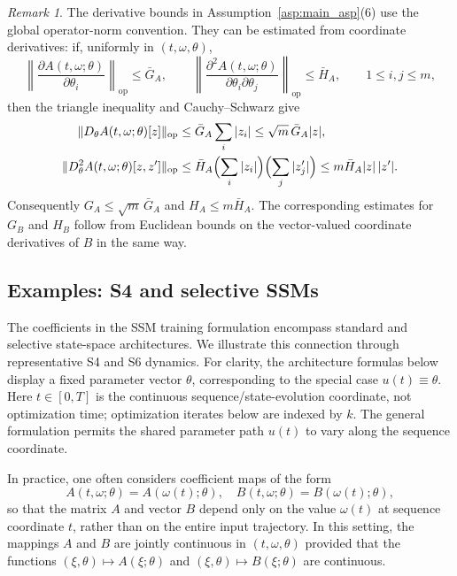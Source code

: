 \documentclass[11pt]{amsart}
\numberwithin{equation}{section} %
\theoremstyle{remark}
\newtheorem{remark}{Remark}[section]
\begin{document}
\begin{remark}\label{rmk:op_norm_AB}
The derivative bounds in Assumption~\ref{asp:main_asp}(6) use the global operator-norm convention. They can be estimated from coordinate derivatives: if, uniformly in $(t,\omega,\theta)$,
\[
    \left\|\frac{\partial A(t,\omega;\theta)}{\partial\theta_i}\right\|_{\mathrm{op}}
    \le\bar G_A,\qquad
    \left\|\frac{\partial^2A(t,\omega;\theta)}{\partial\theta_i\partial\theta_j}\right\|_{\mathrm{op}}
    \le\bar H_A,\qquad 1\le i,j\le m,
\]
then the triangle inequality and Cauchy--Schwarz give
\begin{align*}
    \|D_\theta A(t,\omega;\theta)[z]\|_{\mathrm{op}}
    &\le\bar G_A\sum_i|z_i|
    \le\sqrt m\,\bar G_A|z|,\\
    \|D_\theta^2A(t,\omega;\theta)[z,z']\|_{\mathrm{op}}
    &\le\bar H_A\Bigl(\sum_i|z_i|\Bigr)\Bigl(\sum_j|z'_j|\Bigr)
    \le m\bar H_A|z|\,|z'|.
\end{align*}
Consequently $G_A\le\sqrt m\,\bar G_A$ and $H_A\le m\bar H_A$. The corresponding estimates for $G_B$ and $H_B$ follow from Euclidean bounds on the vector-valued coordinate derivatives of $B$ in the same way.
\end{remark}

\subsection{Examples: S4 and selective SSMs}\label{subsec:ssm_examples}

The coefficients in the SSM training formulation encompass standard and selective state-space architectures. We illustrate this connection through representative S4 and S6 dynamics. For clarity, the architecture formulas below display a fixed parameter vector $\theta$, corresponding to the special case $u(t)\equiv\theta$. Here $t\in[0,T]$ is the continuous sequence/state-evolution coordinate, not optimization time; optimization iterates below are indexed by $k$. The general formulation permits the shared parameter path $u(t)$ to vary along the sequence coordinate.

In practice, one often considers coefficient maps of the form
\[
    A(t, \omega; \theta) = A(\omega(t); \theta), \quad B(t, \omega; \theta) = B(\omega(t); \theta),
\]
so that the matrix $A$ and vector $B$ depend only on the value $\omega(t)$ at sequence coordinate $t$, rather than on the entire input trajectory. In this setting, the mappings $A$ and $B$ are jointly continuous in $(t, \omega, \theta)$ provided that the functions $(\xi, \theta) \mapsto A(\xi; \theta)$ and $(\xi, \theta) \mapsto B(\xi; \theta)$ are continuous.
\end{document}
